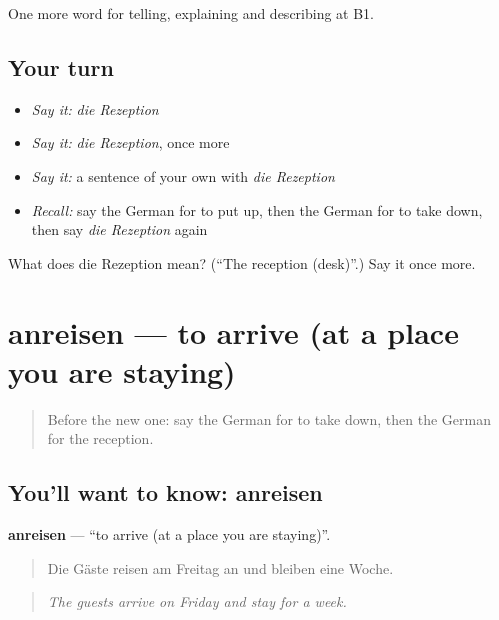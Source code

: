 \begin{grammarlens}[title={What you've built}]
One more word for telling, explaining and describing at B1.
\end{grammarlens}

\subsection*{Your turn}
\begin{itemize}
\raggedright
  \item \emph{Say it:} \emph{die Rezeption}
  \item \emph{Say it:} \emph{die Rezeption}, once more
  \item \emph{Say it:} a sentence of your own with \emph{die Rezeption}
  \item \emph{Recall:} say the German for to put up, then the German for to take down, then say \emph{die Rezeption} again
\end{itemize}

\begin{tcolorbox}[breakable,colback=teal!4,colframe=teal!35!black,title={Before you move on}]
What does die Rezeption mean? (\textquotedblleft{}The reception (desk)\textquotedblright{}.) Say it once more.
\end{tcolorbox}
\section[anreisen]{anreisen — to arrive (at a place you are staying)}

\label{lesson:GE-C426-anreisen}



\begin{quote}
Before the new one: say the German for to take down, then the German for the reception.
\end{quote}

\subsection*{You'll want to know: anreisen}
\textbf{anreisen} — \textquotedblleft{}to arrive (at a place you are staying)\textquotedblright{}.

\begin{quote}
Die Gäste reisen am Freitag an und bleiben eine Woche.
\end{quote}

\begin{quote}
\emph{The guests arrive on Friday and stay for a week.}
\end{quote}

